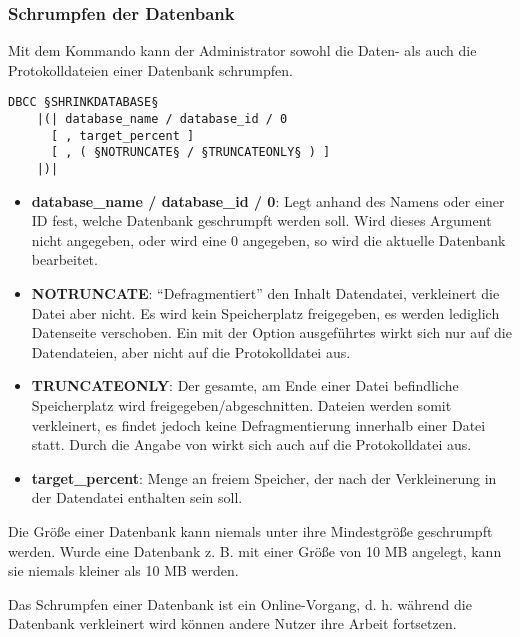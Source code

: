         \subsubsection{Schrumpfen der Datenbank}
          Mit dem Kommando  kann der Administrator
          sowohl die Daten- als auch die Protokolldateien einer Datenbank
          schrumpfen.
          \begin{lstlisting}[language=ebnf, caption={Die Syntax zu
          SHRINKDATABASE}, label=admin03_32]
DBCC §SHRINKDATABASE§
    |(| database_name / database_id / 0 
      [ , target_percent ]
      [ , ( §NOTRUNCATE§ / §TRUNCATEONLY§ ) ]
    |)| 
          \end{lstlisting}
          \begin{itemize}
            \item \textbf{database\_name / database\_id / 0}: Legt anhand des
            Namens oder einer ID fest, welche Datenbank geschrumpft werden soll.
            Wird dieses Argument nicht angegeben, oder wird eine 0 angegeben, so
            wird die aktuelle Datenbank bearbeitet.  
            \item \textbf{NOTRUNCATE}: \enquote{Defragmentiert} den
            Inhalt Datendatei, verkleinert die Datei aber nicht. Es wird
            kein Speicherplatz freigegeben, es werden lediglich Datenseite
            verschoben. Ein mit der Option 
            ausgeführtes  wirkt sich nur
            auf die Datendateien, aber nicht auf die Protokolldatei aus.
            \item \textbf{TRUNCATEONLY}: Der gesamte, am Ende einer
            Datei befindliche Speicherplatz wird freigegeben/abgeschnitten.
            Dateien werden somit verkleinert, es findet jedoch keine
            Defragmentierung innerhalb einer Datei statt. Durch die Angabe von
             wirkt sich  auch auf die Protokolldatei aus.
            \item \textbf{target\_percent}: Menge an freiem Speicher, der nach
            der Verkleinerung in der Datendatei enthalten sein soll.
          \end{itemize}
          \begin{merke}
            Die Größe einer Datenbank kann niemals unter ihre Mindestgröße
            geschrumpft werden. Wurde eine Datenbank z. B. mit einer Größe von 10
            MB angelegt, kann sie niemals kleiner als 10 MB werden.
          \end{merke}
          Das Schrumpfen einer Datenbank ist ein Online-Vorgang, d. h. während die
          Datenbank verkleinert wird können andere Nutzer ihre Arbeit fortsetzen.
          
